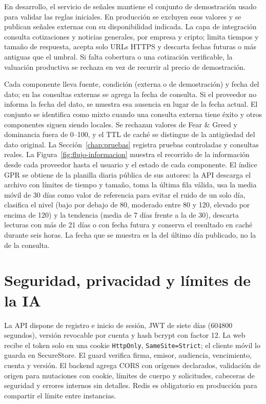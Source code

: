 En desarrollo, el servicio de señales mantiene el conjunto de demostración usado para validar las reglas iniciales. En producción se excluyen esos valores y se publican señales externas con su disponibilidad indicada. La capa de integración consulta cotizaciones y noticias generales, por empresa y cripto; limita tiempos y tamaño de respuesta, acepta solo URLs HTTPS y descarta fechas futuras o más antiguas que el umbral. Si falta cobertura o una cotización verificable, la valuación productiva se rechaza en vez de recurrir al precio de demostración.

Cada componente lleva fuente, condición (externa o de demostración) y fecha del dato; en las consultas externas se agrega la fecha de consulta. Si el proveedor no informa la fecha del dato, se muestra esa ausencia en lugar de la fecha actual. El conjunto se identifica como mixto cuando una consulta externa tiene éxito y otros componentes siguen siendo locales. Se rechazan valores de Fear \& Greed y dominancia fuera de 0--100, y el TTL de caché se distingue de la antigüedad del dato original. La Sección~\ref{chap:pruebas} registra pruebas controladas y consultas reales. La Figura~\ref{fig:flujo-informacion} muestra el recorrido de la información desde cada proveedor hasta el usuario y el estado de cada componente. El índice GPR se obtiene de la planilla diaria pública de sus autores: la API descarga el archivo con límites de tiempo y tamaño, toma la última fila válida, usa la media móvil de 30 días como valor de referencia para evitar el ruido de un solo día, clasifica el nivel (bajo por debajo de 80, moderado entre 80 y 120, elevado por encima de 120) y la tendencia (media de 7 días frente a la de 30), descarta lecturas con más de 21 días o con fecha futura y conserva el resultado en caché durante seis horas. La fecha que se muestra es la del último día publicado, no la de la consulta.


\section{Seguridad, privacidad y límites de la IA}\label{sec:seguridad}

La API dispone de registro e inicio de sesión, JWT de siete días (604800 segundos), versión revocable por cuenta y hash bcrypt con factor 12. La web recibe el token solo en una cookie \texttt{HttpOnly}, \texttt{SameSite=Strict}; el cliente móvil lo guarda en SecureStore. El guard verifica firma, emisor, audiencia, vencimiento, cuenta y versión. El backend agrega CORS con orígenes declarados, validación de origen para mutaciones con cookie, límites de cuerpo y solicitudes, cabeceras de seguridad y errores internos sin detalles. Redis es obligatorio en producción para compartir el límite entre instancias.

